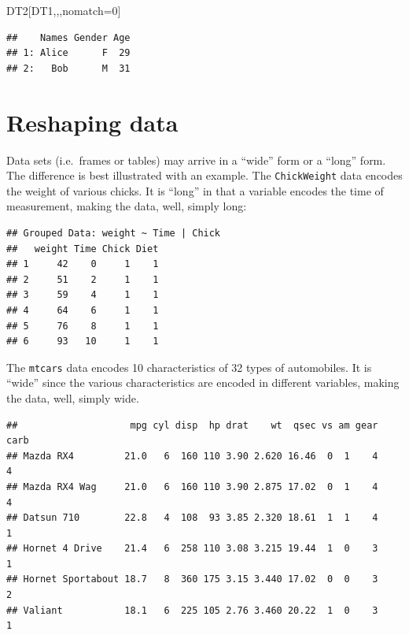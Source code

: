 \documentclass[]{book}
\newenvironment{Shaded}{\begin{snugshade}}{\end{snugshade}}
\newcommand{\DecValTok}[1]{\textcolor[rgb]{0.00,0.00,0.81}{#1}}
\newcommand{\StringTok}[1]{\textcolor[rgb]{0.31,0.60,0.02}{#1}}
\newcommand{\OperatorTok}[1]{\textcolor[rgb]{0.81,0.36,0.00}{\textbf{#1}}}
\newcommand{\NormalTok}[1]{#1}
\theoremstyle{definition}
\theoremstyle{definition}
\theoremstyle{definition}
\theoremstyle{remark}
\begin{document}
\begin{Shaded}
\begin{Highlighting}[]
\NormalTok{DT2[DT1,,,nomatch=}\DecValTok{0}\NormalTok{]}
\end{Highlighting}
\end{Shaded}

\begin{verbatim}
##    Names Gender Age
## 1: Alice      F  29
## 2:   Bob      M  31
\end{verbatim}

\section{Reshaping data}\label{reshaping-data}

Data sets (i.e.~frames or tables) may arrive in a ``wide'' form or a
``long'' form. The difference is best illustrated with an example. The
\texttt{ChickWeight} data encodes the weight of various chicks. It is
``long'' in that a variable encodes the time of measurement, making the
data, well, simply long:

\begin{Shaded}
\end{Shaded}

\begin{verbatim}
## Grouped Data: weight ~ Time | Chick
##   weight Time Chick Diet
## 1     42    0     1    1
## 2     51    2     1    1
## 3     59    4     1    1
## 4     64    6     1    1
## 5     76    8     1    1
## 6     93   10     1    1
\end{verbatim}

The \texttt{mtcars} data encodes 10 characteristics of 32 types of
automobiles. It is ``wide'' since the various characteristics are
encoded in different variables, making the data, well, simply wide.

\begin{Shaded}
\end{Shaded}

\begin{verbatim}
##                    mpg cyl disp  hp drat    wt  qsec vs am gear carb
## Mazda RX4         21.0   6  160 110 3.90 2.620 16.46  0  1    4    4
## Mazda RX4 Wag     21.0   6  160 110 3.90 2.875 17.02  0  1    4    4
## Datsun 710        22.8   4  108  93 3.85 2.320 18.61  1  1    4    1
## Hornet 4 Drive    21.4   6  258 110 3.08 3.215 19.44  1  0    3    1
## Hornet Sportabout 18.7   8  360 175 3.15 3.440 17.02  0  0    3    2
## Valiant           18.1   6  225 105 2.76 3.460 20.22  1  0    3    1
\end{verbatim}
\end{document}
